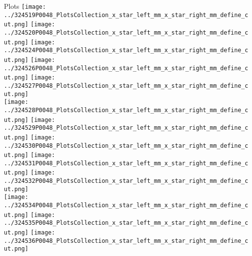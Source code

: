 \documentclass{beamer}
\begin{document}
\begin{frame}
\begin{block}{Plots}
                \texttt{[image: ../324519P0048\_PlotsCollection\_x\_star\_left\_mm\_x\_star\_right\_mm\_define\_cut.png]}
                \texttt{[image: ../324520P0048\_PlotsCollection\_x\_star\_left\_mm\_x\_star\_right\_mm\_define\_cut.png]}
                \texttt{[image: ../324524P0048\_PlotsCollection\_x\_star\_left\_mm\_x\_star\_right\_mm\_define\_cut.png]}
                \texttt{[image: ../324526P0048\_PlotsCollection\_x\_star\_left\_mm\_x\_star\_right\_mm\_define\_cut.png]}
                \texttt{[image: ../324527P0048\_PlotsCollection\_x\_star\_left\_mm\_x\_star\_right\_mm\_define\_cut.png]}\\
                \texttt{[image: ../324528P0048\_PlotsCollection\_x\_star\_left\_mm\_x\_star\_right\_mm\_define\_cut.png]}
                \texttt{[image: ../324529P0048\_PlotsCollection\_x\_star\_left\_mm\_x\_star\_right\_mm\_define\_cut.png]}
                \texttt{[image: ../324530P0048\_PlotsCollection\_x\_star\_left\_mm\_x\_star\_right\_mm\_define\_cut.png]}
                \texttt{[image: ../324531P0048\_PlotsCollection\_x\_star\_left\_mm\_x\_star\_right\_mm\_define\_cut.png]}
                \texttt{[image: ../324532P0048\_PlotsCollection\_x\_star\_left\_mm\_x\_star\_right\_mm\_define\_cut.png]}\\
                \texttt{[image: ../324534P0048\_PlotsCollection\_x\_star\_left\_mm\_x\_star\_right\_mm\_define\_cut.png]}
                \texttt{[image: ../324535P0048\_PlotsCollection\_x\_star\_left\_mm\_x\_star\_right\_mm\_define\_cut.png]}
                \texttt{[image: ../324536P0048\_PlotsCollection\_x\_star\_left\_mm\_x\_star\_right\_mm\_define\_cut.png]}

        \end{block}
\end{frame}
\end{document}
